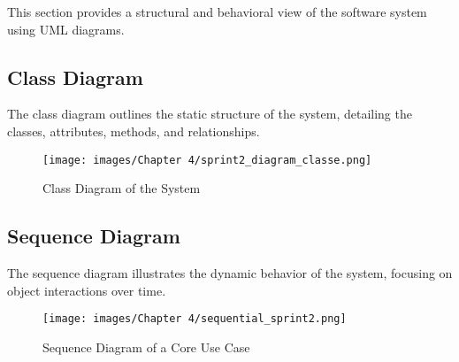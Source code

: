 This section provides a structural and behavioral view of the software system using UML diagrams.

\subsection{Class Diagram}

The class diagram outlines the static structure of the system, detailing the classes, attributes, methods, and relationships.

\begin{figure}[H]
    \centering
    \texttt{[image: images/Chapter 4/sprint2\_diagram\_classe.png]}
    \caption{Class Diagram of the System}
    \label{fig:class-diagram}
\end{figure}

\subsection{Sequence Diagram}

The sequence diagram illustrates the dynamic behavior of the system, focusing on object interactions over time.

\begin{figure}[H]
    \centering
    \texttt{[image: images/Chapter 4/sequential\_sprint2.png]}
    \caption{Sequence Diagram of a Core Use Case}
    \label{fig:sequence-diagram}
\end{figure}
